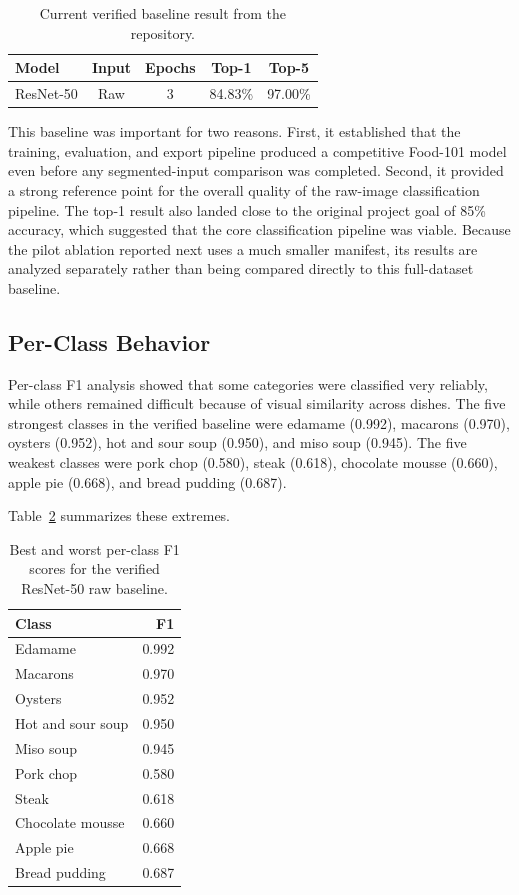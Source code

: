 \documentclass[sigconf,nonacm,11pt]{acmart}
\begin{document}
\begin{table}
  \caption{Current verified baseline result from the repository.}
  \label{tab:baseline-results}
  \begin{tabular}{lcccc}
    \toprule
    Model & Input & Epochs & Top-1 & Top-5 \\
    \midrule
    ResNet-50 & Raw & 3 & 84.83\% & 97.00\% \\
    \bottomrule
  \end{tabular}
\end{table}

This baseline was important for two reasons. First, it established that the training, evaluation, and export pipeline produced a competitive Food-101 model even before any segmented-input comparison was completed. Second, it provided a strong reference point for the overall quality of the raw-image classification pipeline. The top-1 result also landed close to the original project goal of 85\% accuracy, which suggested that the core classification pipeline was viable. Because the pilot ablation reported next uses a much smaller manifest, its results are analyzed separately rather than being compared directly to this full-dataset baseline.

\subsection{Per-Class Behavior}
Per-class F1 analysis showed that some categories were classified very reliably, while others remained difficult because of visual similarity across dishes. The five strongest classes in the verified baseline were edamame (0.992), macarons (0.970), oysters (0.952), hot and sour soup (0.950), and miso soup (0.945). The five weakest classes were pork chop (0.580), steak (0.618), chocolate mousse (0.660), apple pie (0.668), and bread pudding (0.687).

Table~\ref{tab:perclass-extremes} summarizes these extremes.

\begin{table}
  \caption{Best and worst per-class F1 scores for the verified ResNet-50 raw baseline.}
  \label{tab:perclass-extremes}
  \begin{tabular}{lr}
    \toprule
    Class & F1 \\
    \midrule
    Edamame & 0.992 \\
    Macarons & 0.970 \\
    Oysters & 0.952 \\
    Hot and sour soup & 0.950 \\
    Miso soup & 0.945 \\
    \midrule
    Pork chop & 0.580 \\
    Steak & 0.618 \\
    Chocolate mousse & 0.660 \\
    Apple pie & 0.668 \\
    Bread pudding & 0.687 \\
    \bottomrule
  \end{tabular}
\end{table}
\end{document}
